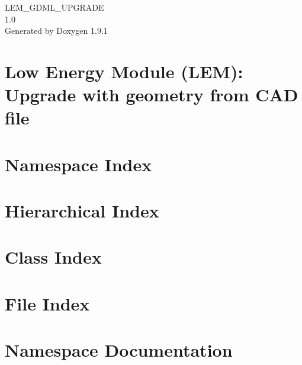 \let\mypdfximage\pdfximage\def\pdfximage{\immediate\mypdfximage}\documentclass[twoside]{book}
\newcommand{\+}{\discretionary{\mbox{\scriptsize$\hookleftarrow$}}{}{}}
\newcommand{\clearemptydoublepage}{%
  \newpage{\pagestyle{empty}\cleardoublepage}%
}
\begin{document}
\raggedbottom

\hypersetup{pageanchor=false,
             bookmarksnumbered=true,
             pdfencoding=unicode
            }
\begin{titlepage}
\vspace*{7cm}
\begin{center}%
{\Large LEM\+\_\+\+GDML\+\_\+\+UPGRADE \\[1ex]\large 1.\+0 }\\
\vspace*{1cm}
{\large Generated by Doxygen 1.9.1}\\
\end{center}
\end{titlepage}
\clearemptydoublepage
{}
\tableofcontents
\clearemptydoublepage
{}
\hypersetup{pageanchor=true}

\chapter{Low Energy Module (LEM)\+: Upgrade with geometry from CAD file}
\label{md_README}

\chapter{Namespace Index}

\chapter{Hierarchical Index}

\chapter{Class Index}

\chapter{File Index}

\chapter{Namespace Documentation}












\end{document}
